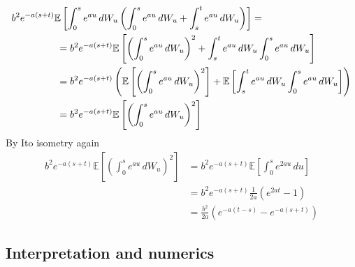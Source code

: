 \documentclass[a4paper,12pt]{article} %
\begin{document}
\begin{align*}
    b^2 e^{-a(s+t)} \mathbb{E} \left[ \int_0^{s} e^{au} \, dW_u \left( \int_0^s e^{au} \, dW_u + \int_s^t e^{au} \, dW_u \right) \right] & =                                                                                                                                                                                                    \\
                                                                                                                                         & \hspace{-7cm}= b^2 e^{-a(s+t)} \mathbb{E} \left[ \left(  \int_0^s e^{au} \, dW_u \right) ^2 + \int_s^t e^{au} \, dW_u  \int_0^{s} e^{au} \, dW_u  \right]                                            \\
                                                                                                                                         & \hspace{-7cm}= b^2 e^{-a(s+t)} \left(  \mathbb{E} \left[ \left(  \int_0^s e^{au} \, dW_u \right) ^2\right] +  \mathbb{E} \left[ \int_s^t e^{au} \, dW_u  \int_0^{s} e^{au} \, dW_u  \right]  \right) \\
                                                                                                                                         & \hspace{-7cm}= b^2 e^{-a(s+t)} \mathbb{E} \left[ \left(  \int_0^s e^{au} \, dW_u \right) ^2\right]                                                                                                   \\
\end{align*}
By Ito isometry again
\begin{align*}
    b^2 e^{-a(s+t)} \mathbb{E} \left[ \left(  \int_0^s e^{au} \, dW_u \right) ^2\right] & = b^2 e^{-a(s+t)} \mathbb{E} \left[\int_0^s e^{2au} \, du \right] \\
                                                                                        & =b^2 e^{-a(s+t)} \frac{1}{2a}\left( e^{2at}-1 \right)             \\
                                                                                        & = \frac{b^{2} }{2a}\left( e^{-a(t-s)} - e^{-a(s+t)} \right)
\end{align*}



\subsection{Interpretation and numerics}
\end{document}
